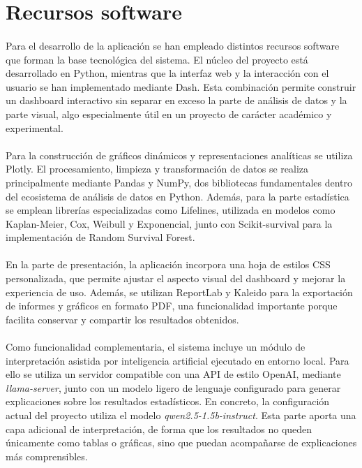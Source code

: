 \section{Recursos software}
\paragraph*{}Para el desarrollo de la aplicación se han empleado distintos recursos software que forman la base tecnológica del sistema. El núcleo del proyecto está desarrollado en Python, mientras que la interfaz web y la interacción con el usuario se han implementado mediante Dash. Esta combinación permite construir un dashboard interactivo sin separar en exceso la parte de análisis de datos y la parte visual, algo especialmente útil en un proyecto de carácter académico y experimental.

\paragraph*{}Para la construcción de gráficos dinámicos y representaciones analíticas se utiliza Plotly. El procesamiento, limpieza y transformación de datos se realiza principalmente mediante Pandas y NumPy, dos bibliotecas fundamentales dentro del ecosistema de análisis de datos en Python. Además, para la parte estadística se emplean librerías especializadas como Lifelines, utilizada en modelos como Kaplan-Meier, Cox, Weibull y Exponencial, junto con Scikit-survival para la implementación de Random Survival Forest.

\paragraph*{}En la parte de presentación, la aplicación incorpora una hoja de estilos CSS personalizada, que permite ajustar el aspecto visual del dashboard y mejorar la experiencia de uso. Además, se utilizan ReportLab y Kaleido para la exportación de informes y gráficos en formato PDF, una funcionalidad importante porque facilita conservar y compartir los resultados obtenidos.

\paragraph*{}Como funcionalidad complementaria, el sistema incluye un módulo de interpretación asistida por inteligencia artificial ejecutado en entorno local. Para ello se utiliza un servidor compatible con una API de estilo OpenAI, mediante \textit{llama-server}, junto con un modelo ligero de lenguaje configurado para generar explicaciones sobre los resultados estadísticos. En concreto, la configuración actual del proyecto utiliza el modelo \textit{qwen2.5-1.5b-instruct}. Esta parte aporta una capa adicional de interpretación, de forma que los resultados no queden únicamente como tablas o gráficas, sino que puedan acompañarse de explicaciones más comprensibles.

